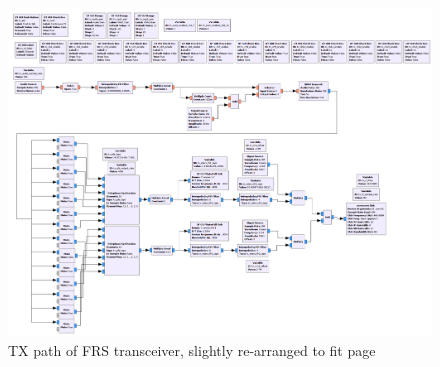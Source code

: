 \newpage
\begin{figure}[h!]
  \label{fig:tx_flowgraph}
  \centering
  \includegraphics[width=6.5in]{images/frs/bladeRF_frs_tx_grc.png}
  \caption{TX path of FRS transceiver, slightly re-arranged to fit page}
\end{figure}

\newpage
{\footnotesize \bib}

